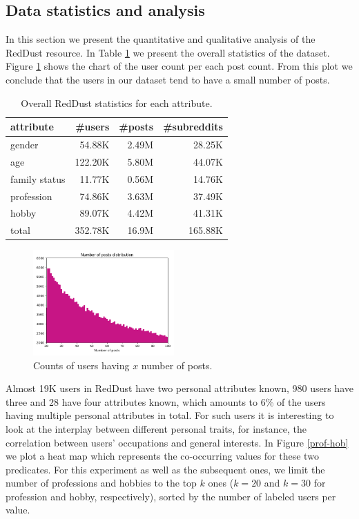 \subsection{Data statistics and analysis}

In this section we present the quantitative and qualitative analysis of the RedDust resource. In Table \ref{stats_table} we present the overall
statistics of the dataset. Figure \ref{num_posts} shows the chart of the user count per each post count. From this plot we conclude that the users in our dataset tend to have a small number of posts.

\begin{table}[h!]
\centering
\small
\begin{adjustbox}{width=0.55\textwidth}
\begin{tabular}{lrrr}
\toprule
\textbf{attribute} & \textbf{\#users} & \textbf{\#posts} & \textbf{\#subreddits} \\
\midrule
gender & 54.88K & 2.49M & 28.25K \\
age & 122.20K & 5.80M & 44.07K \\
family status & 11.77K & 0.56M & 14.76K \\
profession & 74.86K & 3.63M & 37.49K \\
hobby & 89.07K & 4.42M & 41.31K \\
\midrule
total & 352.78K & 16.9M & 165.88K \\
\bottomrule
\end{tabular}
\end{adjustbox}
\caption{Overall RedDust statistics for each attribute.}
\label{stats_table}
\end{table}

\begin{figure}[!h]
\centering
\includegraphics[width=0.48\textwidth]{pics/num_posts.png}
\caption{Counts of users having $x$ number of posts.}
\label{num_posts}
\end{figure}

Almost 19K users in RedDust have two personal attributes known, 980 users have three and 28 have four attributes known,
which amounts to 6\% of the users having multiple personal attributes in total.
For  
such users
it is interesting to look at the interplay between different personal traits, for instance, the correlation between users' occupations and general interests.
In Figure \ref{prof-hob} we plot a heat map which represents the co-occurring values for these two predicates. 
For this experiment as well as the subsequent ones, we limit the number of professions and hobbies to the top $k$ ones ($k=20$ and $k=30$ for profession and hobby, respectively), sorted by the number of labeled users per value.

